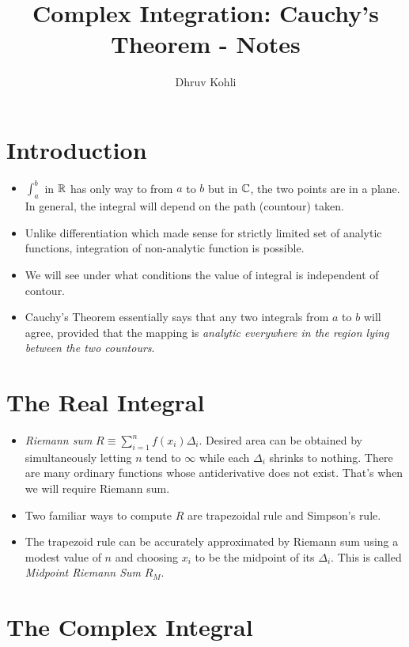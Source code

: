 \documentclass[12pt]{article}
\def\tt{\textit}
\def\mb{\ensuremath\mathbb}
\def\C{\ensuremath\mb{C}}
\def\R{\ensuremath\mb{R}}
\begin{document}
    
\title{Complex Integration: Cauchy's Theorem - Notes}
\author{Dhruv Kohli}
\maketitle
\section{Introduction}
\begin{itemize}
    \item $\int_{a}^{b}$ in $\R$ has only way to from $a$ to $b$ but in $\C$, the two points are in a plane. In general, the integral will depend on the path (countour) taken.
    \item Unlike differentiation which made sense for strictly limited set of analytic functions, integration of non-analytic function is possible.
    \item We will see under what conditions the value of integral is independent of contour.
    \item Cauchy's Theorem essentially says that any two integrals from $a$ to $b$ will agree, provided that the mapping is \tt{analytic everywhere in the region lying between the two countours}.
\end{itemize}
\section{The Real Integral}
\begin{itemize}
    \item \tt{Riemann sum} $R \equiv \sum_{i=1}^{n}f(x_i)\Delta_i$. Desired area can be obtained by simultaneously letting $n$ tend to $\infty$ while each $\Delta_i$ shrinks to nothing. There are many ordinary functions whose antiderivative does not exist. That's when we will require Riemann sum.
    \item Two familiar ways to compute $R$ are trapezoidal rule and Simpson's rule.
    \item The trapezoid rule can be accurately approximated by Riemann sum using a modest value of $n$ and choosing $x_i$ to be the midpoint of its $\Delta_i$. This is called \tt{Midpoint Riemann Sum} $R_M$.
\end{itemize}
\section{The Complex Integral}
\end{document}
